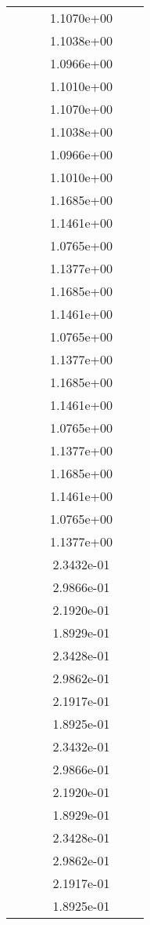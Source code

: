 \begin{xltabular}{\textwidth}{r|rS[table-format=1.3e+2]S[table-format=1.4e+2]S[table-format=1.4e+2]S[table-format=-1.5]}
&  &  & 1.1070e+00 & & \\
&  &  & 1.1038e+00 & & \\
&  &  & 1.0966e+00 & & \\
&  &  & 1.1010e+00 & & \\
&  &  & 1.1070e+00 & & \\
&  &  & 1.1038e+00 & & \\
&  &  & 1.0966e+00 & & \\
&  &  & 1.1010e+00 & & \\
&  &  & 1.1685e+00 & & \\
&  &  & 1.1461e+00 & & \\
&  &  & 1.0765e+00 & & \\
&  &  & 1.1377e+00 & & \\
&  &  & 1.1685e+00 & & \\
&  &  & 1.1461e+00 & & \\
&  &  & 1.0765e+00 & & \\
&  &  & 1.1377e+00 & & \\
&  &  & 1.1685e+00 & & \\
&  &  & 1.1461e+00 & & \\
&  &  & 1.0765e+00 & & \\
&  &  & 1.1377e+00 & & \\
&  &  & 1.1685e+00 & & \\
&  &  & 1.1461e+00 & & \\
&  &  & 1.0765e+00 & & \\
&  &  & 1.1377e+00 & & \\
&  &  & 2.3432e-01 & & \\
&  &  & 2.9866e-01 & & \\
&  &  & 2.1920e-01 & & \\
&  &  & 1.8929e-01 & & \\
&  &  & 2.3428e-01 & & \\
&  &  & 2.9862e-01 & & \\
&  &  & 2.1917e-01 & & \\
&  &  & 1.8925e-01 & & \\
&  &  & 2.3432e-01 & & \\
&  &  & 2.9866e-01 & & \\
&  &  & 2.1920e-01 & & \\
&  &  & 1.8929e-01 & & \\
&  &  & 2.3428e-01 & & \\
&  &  & 2.9862e-01 & & \\
&  &  & 2.1917e-01 & & \\
&  &  & 1.8925e-01 & & \\

\end{xltabular}
